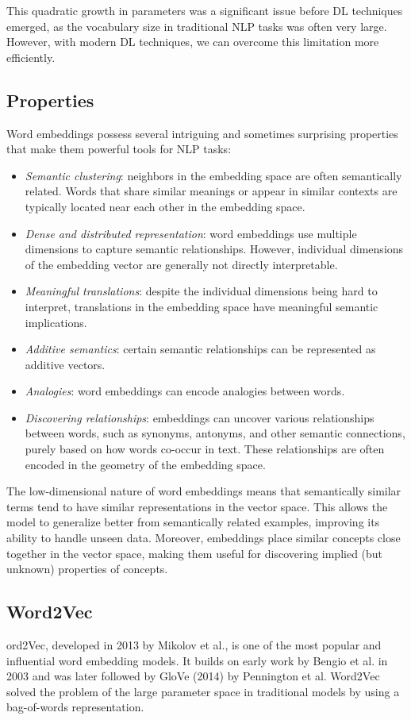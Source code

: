 This quadratic growth in parameters was a significant issue before DL techniques emerged, as the vocabulary size in traditional NLP tasks was often very large. 
However, with modern DL techniques, we can overcome this limitation more efficiently.

\subsection{Properties}
Word embeddings possess several intriguing and sometimes surprising properties that make them powerful tools for NLP tasks:
\begin{itemize}
    \item \textit{Semantic clustering}: neighbors in the embedding space are often semantically related. 
        Words that share similar meanings or appear in similar contexts are typically located near each other in the embedding space.
    \item \textit{Dense and distributed representation}: word embeddings use multiple dimensions to capture semantic relationships. 
        However, individual dimensions of the embedding vector are generally not directly interpretable.
    \item \textit{Meaningful translations}: despite the individual dimensions being hard to interpret, translations in the embedding space have meaningful semantic implications. 
    \item \textit{Additive semantics}: certain semantic relationships can be represented as additive vectors. 
    \item \textit{Analogies}: word embeddings can encode analogies between words. 
    \item \textit{Discovering relationships}: embeddings can uncover various relationships between words, such as synonyms, antonyms, and other semantic connections, purely based on how words co-occur in text. 
        These relationships are often encoded in the geometry of the embedding space.
\end{itemize}
\noindent The low-dimensional nature of word embeddings means that semantically similar terms tend to have similar representations in the vector space. 
This allows the model to generalize better from semantically related examples, improving its ability to handle unseen data. 
Moreover, embeddings place similar concepts close together in the vector space, making them useful for discovering implied (but unknown) properties of concepts. 

\subsection{Word2Vec}
ord2Vec, developed in 2013 by Mikolov et al., is one of the most popular and influential word embedding models. 
It builds on early work by Bengio et al. in 2003 and was later followed by GloVe (2014) by Pennington et al. Word2Vec solved the problem of the large parameter space in traditional models by using a bag-of-words representation.

